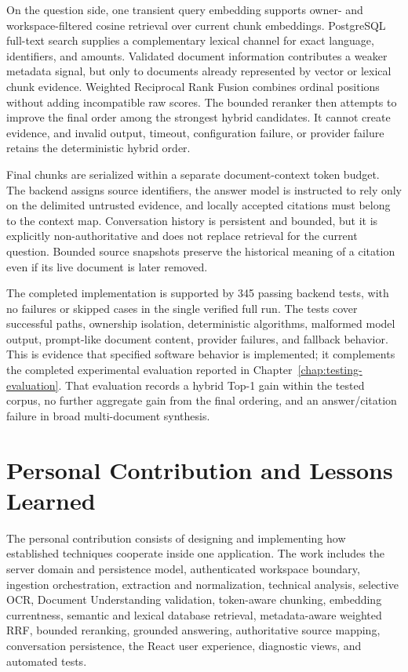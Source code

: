 On the question side, one transient query embedding supports owner- and workspace-filtered cosine retrieval over current chunk embeddings. PostgreSQL full-text search supplies a complementary lexical channel for exact language, identifiers, and amounts. Validated document information contributes a weaker metadata signal, but only to documents already represented by vector or lexical chunk evidence. Weighted Reciprocal Rank Fusion combines ordinal positions without adding incompatible raw scores. The bounded reranker then attempts to improve the final order among the strongest hybrid candidates. It cannot create evidence, and invalid output, timeout, configuration failure, or provider failure retains the deterministic hybrid order.

Final chunks are serialized within a separate document-context token budget. The backend assigns source identifiers, the answer model is instructed to rely only on the delimited untrusted evidence, and locally accepted citations must belong to the context map. Conversation history is persistent and bounded, but it is explicitly non-authoritative and does not replace retrieval for the current question. Bounded source snapshots preserve the historical meaning of a citation even if its live document is later removed.

The completed implementation is supported by 345 passing backend tests, with no failures or skipped cases in the single verified full run. The tests cover successful paths, ownership isolation, deterministic algorithms, malformed model output, prompt-like document content, provider failures, and fallback behavior. This is evidence that specified software behavior is implemented; it complements the completed experimental evaluation reported in Chapter~\ref{chap:testing-evaluation}. That evaluation records a hybrid Top-1 gain within the tested corpus, no further aggregate gain from the final ordering, and an answer/citation failure in broad multi-document synthesis.

\section{Personal Contribution and Lessons Learned}

The personal contribution consists of designing and implementing how established techniques cooperate inside one application. The work includes the server domain and persistence model, authenticated workspace boundary, ingestion orchestration, extraction and normalization, technical analysis, selective OCR, Document Understanding validation, token-aware chunking, embedding currentness, semantic and lexical database retrieval, metadata-aware weighted RRF, bounded reranking, grounded answering, authoritative source mapping, conversation persistence, the React user experience, diagnostic views, and automated tests.

